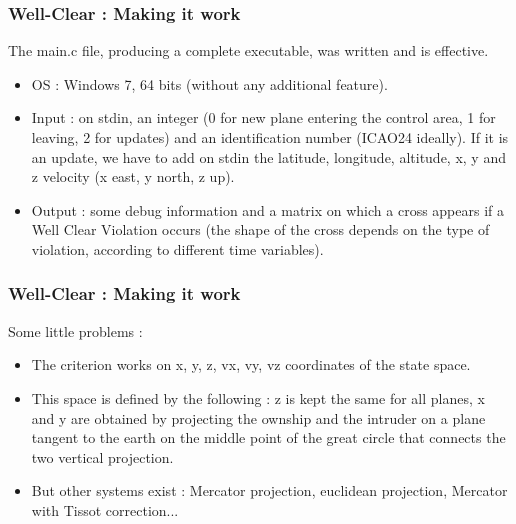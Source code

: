 \documentclass{beamer}
\begin{document}
\begin{frame}[fragile]
	\frametitle{Well-Clear : Making it work}
	
	The main.c file, producing a complete executable, was written and is effective.
	\begin{itemize}
		\item OS : Windows 7, 64 bits (without any additional feature).
		\item Input : on stdin, an integer (0 for new plane entering the control area, 1 for leaving, 2 for updates) and an identification number (ICAO24 ideally). If it is an update, we have to add on stdin the latitude, longitude, altitude, x, y and z velocity (x east, y north, z up).
		\item Output : some debug information and a matrix on which a cross appears if a Well Clear Violation occurs (the shape of the cross depends on the type of violation, according to different time variables).
	\end{itemize}
	
\end{frame}

\begin{frame}[fragile]
	\frametitle{Well-Clear : Making it work}
	
	Some little problems :
	\begin{itemize}
		\item The criterion works on x, y, z, vx, vy, vz coordinates of the state space.
		\item This space is defined by the following : z is kept the same for all planes, x and y are obtained by projecting the ownship and the intruder on a plane tangent to the earth on the middle point of the great circle that connects the two vertical projection.
		\item But other systems exist : Mercator projection, euclidean projection, Mercator with Tissot correction...
	\end{itemize}
	
\end{frame}
\end{document}
